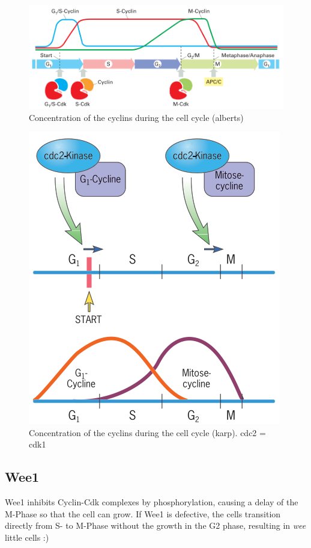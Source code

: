 \documentclass{article}
\begin{document}
	\begin{figure}[H]
		\centering
		\includegraphics[width=\linewidth]{cyclin_activity_alberts.png}
		\caption{Concentration of the cyclins during the cell cycle (alberts)}
	\end{figure}
	
	\begin{figure}[H]
		\centering
		\includegraphics[width=0.8\linewidth]{cyclin_activity_karp.png}
		\caption{Concentration of the cyclins during the cell cycle (karp). cdc2 = cdk1}
	\end{figure}
	
	\subsection{Wee1}
	Wee1 inhibits Cyclin-Cdk complexes by phosphorylation, causing a delay of the M-Phase so that the cell can grow. If Wee1 is defective, the cells transition directly from S- to M-Phase without the growth in the G2 phase, resulting in \textit{wee} little cells :)
	
\end{document}
